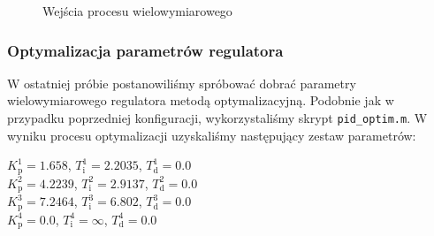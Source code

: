 \begin{figure}
    \begin{subfigure}[b]{\textwidth}
        \centering
    \end{subfigure}

    \caption{Wejścia procesu wielowymiarowego}
    \label{pro_pid_konf2_in2}
\end{figure}
\FloatBarrier

\subsubsection{Optymalizacja parametrów regulatora}

W ostatniej próbie postanowiliśmy spróbować dobrać parametry wielowymiarowego 
regulatora metodą optymalizacyjną. Podobnie jak w przypadku poprzedniej konfiguracji,
wykorzystaliśmy skrypt \verb+pid_optim.m+. W wyniku procesu optymalizacji uzyskaliśmy następujący
zestaw parametrów:

\begin{center}
    $K^{\num{1}}_{\mathrm{p}} = \num{1.658}$, $T^{\num{1}}_{\mathrm{i}} = \num{2.2035}$, $T^{\num{1}}_{\mathrm{d}} = \num{0.0}$ \\
    $K^{\num{2}}_{\mathrm{p}} = \num{4.2239}$, $T^{\num{2}}_{\mathrm{i}} = \num{2.9137}$, $T^{\num{2}}_{\mathrm{d}} = \num{0.0}$ \\
    $K^{\num{3}}_{\mathrm{p}} = \num{7.2464}$, $T^{\num{3}}_{\mathrm{i}} = \num{6.802}$, $T^{\num{3}}_{\mathrm{d}} = \num{0.0}$ \\
    $K^{\num{4}}_{\mathrm{p}} = \num{0.0}$, $T^{\num{4}}_{\mathrm{i}} = \infty$, $T^{\num{4}}_{\mathrm{d}} = \num{0.0}$ \\
\end{center}

